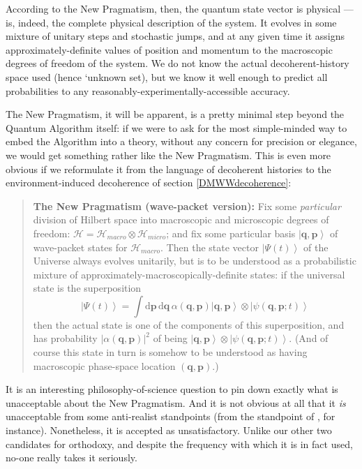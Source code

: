 \documentclass[12pt]{article}
\newcommand{\be}{\begin{equation}}
\newcommand{\ee}{\end{equation}}
\newcommand{\vctr}[1]{\ensuremath{\mathbf{ #1 }}}
\newcommand{\dr}[1]{\ensuremath{\mathrm{d} #1\,}}
\newcommand{\mc}[1]{\ensuremath{\mathcal{#1}}}
\newcommand{\ket}[1]{\ensuremath{\left|  #1 \right\rangle}}
\newcommand{\tpk}[2]{\ensuremath{\ket{#1}\!\otimes\!\ket{#2}}}
\begin{document}
According to the New Pragmatism, then, the quantum state vector is physical --- is, indeed, the complete physical description of the system. It evolves in some mixture of unitary steps and stochastic jumps, and at any given time it assigns approximately-definite values of position and momentum to the macroscopic degrees of freedom of the system. We do not know the actual decoherent-history space used (hence `unknown set), but we know it well enough to predict all probabilities to any reasonably-experimentally-accessible accuracy.

The New Pragmatism, it will be apparent, is a pretty minimal step beyond the Quantum Algorithm itself: if we were to ask for the most simple-minded way to embed the Algorithm into a theory, without any concern for precision or elegance, we would get something rather like the New Pragmatism. This is even more obvious if we reformulate it from the language of decoherent histories to the environment-induced decoherence of section \ref{DMWWdecoherence}:
\begin{quote}
\textbf{The New Pragmatism (wave-packet version):}
Fix some \emph{particular} division of Hilbert space into macroscopic and microscopic degrees of freedom: $\mc{H}=\mc{H}_{macro}\otimes \mc{H}_{micro}$; and fix some particular basis $\ket{\vctr{q},\vctr{p}}$ of wave-packet states for $\mc{H}_{macro}$. Then the state vector \ket{\Psi(t)} of the Universe always evolves unitarily, but is to be understood as a probabilistic mixture of approximately-macroscopically-definite states: if the universal state is the superposition
\be
\ket{\Psi(t)}=\int\dr{\vctr{p}}\dr{\vctr{q}}\alpha(\vctr{q},\vctr{p})\tpk{\vctr{q},\vctr{p}}{\psi(\vctr{q},\vctr{p};t)}
\ee
then the actual state is one of the components of this superposition, and has probability
$|\alpha(\vctr{q},\vctr{p})|^2$ of being $\tpk{\vctr{q},\vctr{p}}{\psi(\vctr{q},\vctr{p};t)}$.
(And of course this state in turn is somehow to be understood as having macroscopic phase-space location $(\vctr{q},\vctr{p})$.)
\end{quote} 
It is an interesting philosophy-of-science question to pin down exactly what is unacceptable about the New Pragmatism. And it is not obvious at all that it \emph{is} unacceptable from some anti-realist standpoints (from the standpoint of , for instance). Nonetheless, it is accepted as unsatisfactory. Unlike our other two candidates for orthodoxy, and despite the frequency with which it is in fact used, no-one really takes it seriously. 
\end{document}
